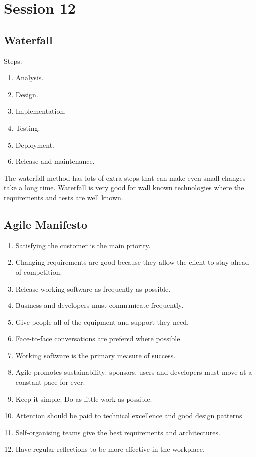 \section{Session 12}\label{sec:session_12}

\subsection{Waterfall}\label{sub:waterfall}

Steps:
\begin{enumerate}
	\item Analysis.
	\item Design.
	\item Implementation.
	\item Testing.
	\item Deployment.
	\item Release and maintenance.
\end{enumerate}

\noindent
The waterfall method has lots of extra steps that can make even small changes take a long time.
Waterfall is very good for wall known technologies where the requirements and tests are well known.

\subsection{Agile Manifesto}\label{sub:agile_manifesto}

\begin{enumerate}
	\item Satisfying the customer is the main priority.
	\item Changing requirements are good because they allow the client to stay ahead of competition.
	\item Release working software as frequently as possible.
	\item Business and developers must communicate frequently.
	\item Give people all of the equipment and support they need.
	\item Face-to-face conversations are prefered where possible.
	\item Working software is the primary measure of success.
	\item Agile promotes sustainability: sponsors, users and developers must move at a constant pace for ever.
	\item Keep it simple. Do as little work as possible.
	\item Attention should be paid to technical excellence and good design patterns.
	\item Self-organising teams give the best requirements and architectures.
	\item Have regular reflections to be more effective in the workplace.
\end{enumerate}


